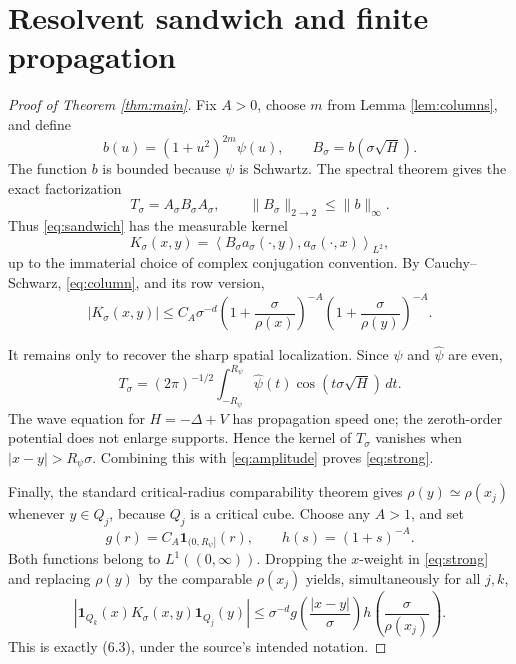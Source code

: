 \documentclass[11pt]{article}
\newcommand{\1}{\mathbf 1}
\begin{document}
\section*{Resolvent sandwich and finite propagation}

\begin{proof}[Proof of Theorem \ref{thm:main}]
Fix \(A>0\), choose \(m\) from Lemma \ref{lem:columns}, and define
\[
 b(u)=(1+u^2)^{2m}\psi(u),\qquad B_\sigma=b(\sigma\sqrt H).
\]
The function \(b\) is bounded because \(\psi\) is Schwartz. The spectral
theorem gives the exact factorization
\begin{equation}\label{eq:sandwich}
 T_\sigma=A_\sigma B_\sigma A_\sigma,
 \qquad \|B_\sigma\|_{2\to2}\leq\|b\|_\infty.
\end{equation}
Thus \eqref{eq:sandwich} has the measurable kernel
\[
 K_\sigma(x,y)
 =\left\langle B_\sigma a_\sigma(\cdot,y),
                      a_\sigma(\cdot,x)\right\rangle_{L^2},
\]
up to the immaterial choice of complex conjugation convention. By
Cauchy--Schwarz, \eqref{eq:column}, and its row version,
\begin{equation}\label{eq:amplitude}
 |K_\sigma(x,y)|\leq C_A\sigma^{-d}
 \left(1+\frac{\sigma}{\rho(x)}\right)^{-A}
 \left(1+\frac{\sigma}{\rho(y)}\right)^{-A}.
\end{equation}

It remains only to recover the sharp spatial localization. Since \(\psi\)
and \(\widehat\psi\) are even,
\[
 T_\sigma=(2\pi)^{-1/2}\int_{-R_\psi}^{R_\psi}
 \widehat\psi(t)\cos(t\sigma\sqrt H)\,dt.
\]
The wave equation for \(H=-\Delta+V\) has propagation speed one; the
zeroth-order potential does not enlarge supports. Hence the kernel of
\(T_\sigma\) vanishes when \(|x-y|>R_\psi\sigma\). Combining this with
\eqref{eq:amplitude} proves \eqref{eq:strong}.

Finally, the standard critical-radius comparability theorem gives
\(\rho(y)\simeq\rho(x_j)\) whenever \(y\in Q_j\), because \(Q_j\) is a
critical cube. Choose any \(A>1\), and set
\[
 g(r)=C_A\1_{(0,R_\psi]}(r),\qquad h(s)=(1+s)^{-A}.
\]
Both functions belong to \(L^1((0,\infty))\). Dropping the \(x\)-weight in
\eqref{eq:strong} and replacing \(\rho(y)\) by the comparable
\(\rho(x_j)\) yields, simultaneously for all \(j,k\),
\[
 \left|\1_{Q_k}(x)K_\sigma(x,y)\1_{Q_j}(y)\right|
 \leq\sigma^{-d}g\left(\frac{|x-y|}{\sigma}\right)
 h\left(\frac{\sigma}{\rho(x_j)}\right).
\]
This is exactly (6.3), under the source's intended notation.
\end{proof}
\end{document}
